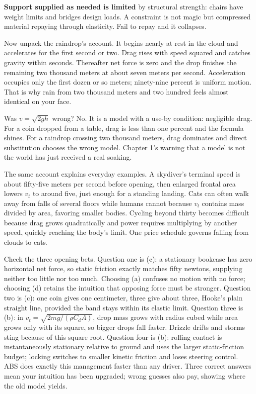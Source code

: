 \textbf{Support supplied as needed is limited} by structural strength: chairs have weight limits and bridges design loads. A constraint is not magic but compressed material repaying through elasticity. Fail to repay and it collapses.


Now unpack the raindrop's account. It begins nearly at rest in the cloud and accelerates for the first second or two. Drag rises with speed squared and catches gravity within seconds. Thereafter net force is zero and the drop finishes the remaining two thousand meters at about seven meters per second. Acceleration occupies only the first dozen or so meters; ninety-nine percent is uniform motion. That is why rain from two thousand meters and two hundred feels almost identical on your face.

Was \(v=\sqrt{2gh}\) wrong? No. It is a model with a use-by condition: negligible drag. For a coin dropped from a table, drag is less than one percent and the formula shines. For a raindrop crossing two thousand meters, drag dominates and direct substitution chooses the wrong model. Chapter 1's warning that a model is not the world has just received a real soaking.

The same account explains everyday examples. A skydiver's terminal speed is about fifty-five meters per second before opening, then enlarged frontal area lowers \(v_t\) to around five, just enough for a standing landing. Cats can often walk away from falls of several floors while humans cannot because \(v_t\) contains mass divided by area, favoring smaller bodies. Cycling beyond thirty becomes difficult because drag grows quadratically and power requires multiplying by another speed, quickly reaching the body's limit. One price schedule governs falling from clouds to cats.

Check the three opening bets. Question one is (c): a stationary bookcase has zero horizontal net force, so static friction exactly matches fifty newtons, supplying neither too little nor too much. Choosing (a) confuses no motion with no force; choosing (d) retains the intuition that opposing force must be stronger. Question two is (c): one coin gives one centimeter, three give about three, Hooke's plain straight line, provided the band stays within its elastic limit. Question three is (b): in \(v_t=\sqrt{2mg/(\rho C_d A)}\), drop mass grows with radius cubed while area grows only with its square, so bigger drops fall faster. Drizzle drifts and storms sting because of this square root. Question four is (b): rolling contact is instantaneously stationary relative to ground and uses the larger static-friction budget; locking switches to smaller kinetic friction and loses steering control. ABS does exactly this management faster than any driver. Three correct answers mean your intuition has been upgraded; wrong guesses also pay, showing where the old model yields.

